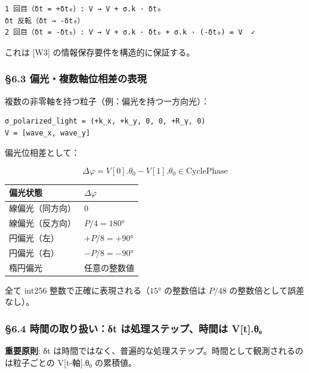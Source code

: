 \documentclass[a4paper,11pt]{ltjsarticle}
\newcounter{none}
\begin{document}
\begin{verbatim}
1 回目（δt = +δt₀）: V → V + σ.k · δt₀
δt 反転（δt → -δt₀）
2 回目（δt = -δt₀）: V → V + σ.k · δt₀ + σ.k · (-δt₀) = V  ✓
\end{verbatim}

これは {[}W3{]} の情報保存要件を構造的に保証する。

\subsubsection{§6.3
偏光・複数軸位相差の表現}\label{ux504fux5149ux8907ux6570ux8ef8ux4f4dux76f8ux5deeux306eux8868ux73fe}

複数の非零軸を持つ粒子（例：偏光を持つ一方向光）：

\begin{verbatim}
σ_polarized_light = (+k_x, +k_y, 0, 0, +R_γ, 0)
V = [wave_x, wave_y]
\end{verbatim}

偏光位相差として：

\[\Delta\varphi = V[0].\theta_0 - V[1].\theta_0 \in \text{CyclePhase}\]

{\def\LTcaptype{none} %
\begin{longtable}[]{@{}ll@{}}
\toprule\noalign{}
偏光状態 & \(\Delta\varphi\) \\
\midrule\noalign{}
\endhead
\bottomrule\noalign{}
\endlastfoot
線偏光（同方向） & \(0\) \\
線偏光（反方向） & \(P/4 = 180°\) \\
円偏光（左） & \(+P/8 = +90°\) \\
円偏光（右） & \(-P/8 = -90°\) \\
楕円偏光 & 任意の整数値 \\
\end{longtable}
}

全て int256 整数で正確に表現される（\(15°\) の整数倍は \(P/48\)
の整数倍として誤差なし）。

\subsubsection{§6.4 時間の取り扱い：δt は処理ステップ、時間は
V{[}t{]}.θ₀}\label{ux6642ux9593ux306eux53d6ux308aux6271ux3044ux3b4t-ux306fux51e6ux7406ux30b9ux30c6ux30c3ux30d7ux6642ux9593ux306f-vt.ux3b8ux2080}

\textbf{重要原則}: δt
は時間ではなく、普遍的な処理ステップ。時間として観測されるのは粒子ごとの
V{[}t-軸{]}.θ₀ の累積値。
\end{document}
